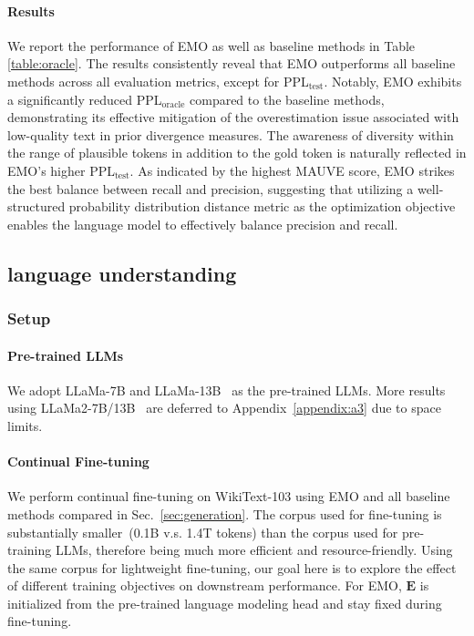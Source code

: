 \paragraph{Results}
We report the performance of EMO as well as baseline methods in Table \ref{table:oracle}. The results consistently reveal that EMO outperforms all baseline methods across all evaluation metrics, except for PPL$_\text{test}$. Notably, EMO exhibits a significantly reduced PPL$_{\text{oracle}}$ compared to the baseline methods, demonstrating its effective mitigation of the overestimation issue associated with low-quality text in prior divergence measures. The awareness of diversity within the range of plausible tokens in addition to the gold token is naturally reflected in EMO's higher PPL$_\text{test}$. As indicated by the highest MAUVE score, EMO strikes the best balance between recall and precision, suggesting that utilizing a well-structured probability distribution distance metric as the optimization objective enables the language model to effectively balance precision and recall.
\subsection{language understanding}
\label{sec:nlu_all}
\subsubsection{Setup}
\paragraph{Pre-trained LLMs} We adopt LLaMa-7B and LLaMa-13B~\citep{llama1} as the pre-trained LLMs. More results using LLaMa2-7B/13B~\citep{llama2} are deferred to Appendix~\ref{appendix:a3} due to space limits.
\paragraph{Continual Fine-tuning} We perform continual fine-tuning on WikiText-103 using EMO and all baseline methods compared in Sec.~\ref{sec:generation}. The corpus used for fine-tuning is substantially smaller~(0.1B v.s. 1.4T tokens) than the corpus used for pre-training LLMs, therefore being much more efficient and resource-friendly. Using the same corpus for lightweight fine-tuning, our goal here is to explore the effect of different training objectives on downstream performance. For EMO, $\bm{E}$ is initialized from the pre-trained language modeling head and stay fixed during fine-tuning.
